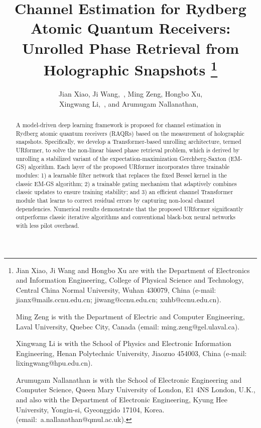\documentclass[journal]{IEEEtran}
\begin{document}
\title{\huge Channel Estimation for Rydberg Atomic Quantum Receivers: Unrolled Phase Retrieval from Holographic Snapshots
\thanks{

	Jian Xiao, Ji Wang and Hongbo Xu are with the Department of Electronics and Information Engineering, College of Physical Science and Technology, Central China Normal University, Wuhan 430079, China (e-mail: jianx@mails.ccnu.edu.cn; jiwang@ccnu.edu.cn; xuhb@ccnu.edu.cn). 
	
	Ming Zeng is with the Department of Electric and Computer Engineering, Laval University, Quebec City, Canada (email: ming.zeng@gel.ulaval.ca).
	
	Xingwang Li is with the School of Physics and Electronic Information Engineering, Henan Polytechnic University, Jiaozuo 454003, China (e-mail: lixingwang@hpu.edu.cn).
	
	 Arumugam Nallanathan is with the School of Electronic Engineering and Computer Science, Queen Mary University of London, E1 4NS London, U.K., and also with the Department of Electronic Engineering, Kyung Hee University, Yongin-si, Gyeonggido 17104, Korea. (email: a.nallanathan@qmul.ac.uk).

	 
	}
	}
\author{Jian Xiao, Ji Wang,~, Ming Zeng, Hongbo Xu,\\ Xingwang Li,~, and Arumugam Nallanathan,~}
\maketitle
\begin{abstract}
A model-driven deep learning framework is proposed for channel estimation in Rydberg atomic quantum receivers (RAQRs) based on the measurement of holographic snapshots. Specifically, we develop a Transformer-based unrolling architecture, termed URformer, to solve the non-linear biased phase retrieval problem, which is derived by unrolling a stabilized variant of the expectation-maximization Gerchberg-Saxton (EM-GS) algorithm. Each layer of the proposed URformer incorporates three trainable modules: 1) a learnable filter network that replaces the fixed Bessel kernel in the classic EM-GS algorithm; 2) a trainable gating mechanism that adaptively combines classic updates to ensure training stability; and 3) an efficient channel Transformer module that learns to correct residual errors by capturing non-local channel dependencies. Numerical results demonstrate that the proposed URformer significantly outperforms classic iterative algorithms and conventional black-box neural networks with less pilot overhead.
\end{abstract}
\end{document}
